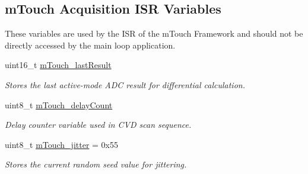 \subsection*{m\+Touch Acquisition I\+S\+R Variables}
\label{_amgrpd8ec0cfe8287733f0d3c2a715e39ed21}%
These variables are used by the I\+S\+R of the m\+Touch Framework and should not be directly accessed by the main loop application. \begin{DoxyCompactItemize}
\item 
uint16\+\_\+t \hyperlink{group___acquisition_ga6890b3a94dbdd045d66ec2b025cddda6}{m\+Touch\+\_\+last\+Result}
\begin{DoxyCompactList}\small\item\em Stores the last active-\/mode A\+D\+C result for differential calculation. \end{DoxyCompactList}\item 
uint8\+\_\+t \hyperlink{group___acquisition_gaf6d2f71af7a6dfd8571cbd141c40053e}{m\+Touch\+\_\+delay\+Count}
\begin{DoxyCompactList}\small\item\em Delay counter variable used in C\+V\+D scan sequence. \end{DoxyCompactList}\item 
uint8\+\_\+t \hyperlink{group___acquisition_ga800eae7ce7292a55c5d60975179ea26a}{m\+Touch\+\_\+jitter} = 0x55
\begin{DoxyCompactList}\small\item\em Stores the current random seed value for jittering. \end{DoxyCompactList}\end{DoxyCompactItemize}

